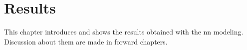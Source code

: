 \chapter{Results}\label{sec:results}

This chapter introduces and shows the results obtained with the \gls*{nn} modeling. Discussion about them are made in forward chapters.